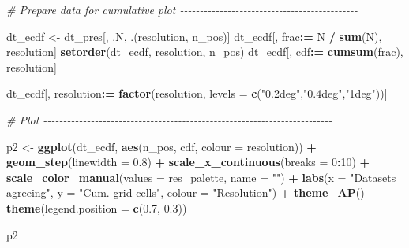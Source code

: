 \documentclass[
  11pt,
]{article}
\newenvironment{Shaded}{\begin{snugshade}}{\end{snugshade}}
\newcommand{\AttributeTok}[1]{\textcolor[rgb]{0.13,0.29,0.53}{#1}}
\newcommand{\CommentTok}[1]{\textcolor[rgb]{0.56,0.35,0.01}{\textit{#1}}}
\newcommand{\DecValTok}[1]{\textcolor[rgb]{0.00,0.00,0.81}{#1}}
\newcommand{\FloatTok}[1]{\textcolor[rgb]{0.00,0.00,0.81}{#1}}
\newcommand{\FunctionTok}[1]{\textcolor[rgb]{0.13,0.29,0.53}{\textbf{#1}}}
\newcommand{\NormalTok}[1]{#1}
\newcommand{\OtherTok}[1]{\textcolor[rgb]{0.56,0.35,0.01}{#1}}
\newcommand{\SpecialCharTok}[1]{\textcolor[rgb]{0.81,0.36,0.00}{\textbf{#1}}}
\newcommand{\StringTok}[1]{\textcolor[rgb]{0.31,0.60,0.02}{#1}}
\begin{document}
\begin{Shaded}
\begin{Highlighting}[]
\CommentTok{\# Prepare data for cumulative plot {-}{-}{-}{-}{-}{-}{-}{-}{-}{-}{-}{-}{-}{-}{-}{-}{-}{-}{-}{-}{-}{-}{-}{-}{-}{-}{-}{-}{-}{-}{-}{-}{-}{-}{-}{-}{-}{-}{-}{-}{-}{-}{-}{-}{-}}

\NormalTok{dt\_ecdf }\OtherTok{\textless{}{-}}\NormalTok{ dt\_pres[, .N, .(resolution, n\_pos)]}
\NormalTok{dt\_ecdf[, frac}\SpecialCharTok{:=}\NormalTok{ N }\SpecialCharTok{/} \FunctionTok{sum}\NormalTok{(N), resolution]}
\FunctionTok{setorder}\NormalTok{(dt\_ecdf, resolution, n\_pos)}
\NormalTok{dt\_ecdf[, cdf}\SpecialCharTok{:=} \FunctionTok{cumsum}\NormalTok{(frac), resolution]}

\NormalTok{dt\_ecdf[, resolution}\SpecialCharTok{:=} \FunctionTok{factor}\NormalTok{(resolution, }\AttributeTok{levels =} \FunctionTok{c}\NormalTok{(}\StringTok{"0.2deg"}\NormalTok{,}\StringTok{"0.4deg"}\NormalTok{,}\StringTok{"1deg"}\NormalTok{))]}

\CommentTok{\# Plot {-}{-}{-}{-}{-}{-}{-}{-}{-}{-}{-}{-}{-}{-}{-}{-}{-}{-}{-}{-}{-}{-}{-}{-}{-}{-}{-}{-}{-}{-}{-}{-}{-}{-}{-}{-}{-}{-}{-}{-}{-}{-}{-}{-}{-}{-}{-}{-}{-}{-}{-}{-}{-}{-}{-}{-}{-}{-}{-}{-}{-}{-}{-}{-}{-}{-}{-}{-}{-}{-}{-}{-}{-}}

\NormalTok{p2 }\OtherTok{\textless{}{-}} \FunctionTok{ggplot}\NormalTok{(dt\_ecdf, }\FunctionTok{aes}\NormalTok{(n\_pos, cdf, }\AttributeTok{colour =}\NormalTok{ resolution)) }\SpecialCharTok{+}
  \FunctionTok{geom\_step}\NormalTok{(}\AttributeTok{linewidth =} \FloatTok{0.8}\NormalTok{) }\SpecialCharTok{+}
  \FunctionTok{scale\_x\_continuous}\NormalTok{(}\AttributeTok{breaks =} \DecValTok{0}\SpecialCharTok{:}\DecValTok{10}\NormalTok{) }\SpecialCharTok{+}
  \FunctionTok{scale\_color\_manual}\NormalTok{(}\AttributeTok{values =}\NormalTok{ res\_palette, }\AttributeTok{name =} \StringTok{""}\NormalTok{) }\SpecialCharTok{+}
  \FunctionTok{labs}\NormalTok{(}\AttributeTok{x =} \StringTok{"Datasets agreeing"}\NormalTok{, }\AttributeTok{y =} \StringTok{"Cum. grid cells"}\NormalTok{,}
       \AttributeTok{colour =} \StringTok{"Resolution"}\NormalTok{) }\SpecialCharTok{+}
  \FunctionTok{theme\_AP}\NormalTok{() }\SpecialCharTok{+}
  \FunctionTok{theme}\NormalTok{(}\AttributeTok{legend.position =} \FunctionTok{c}\NormalTok{(}\FloatTok{0.7}\NormalTok{, }\FloatTok{0.3}\NormalTok{))}

\NormalTok{p2}
\end{Highlighting}
\end{Shaded}
\end{document}
